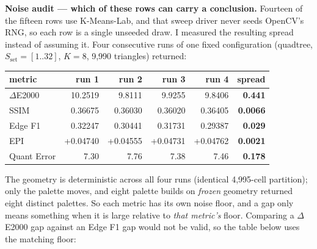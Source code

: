\documentclass[11pt,a4paper]{article}
\begin{document}
\textbf{Noise audit --- which of these rows can carry a conclusion.} Fourteen of
the fifteen rows use K-Means-Lab, and that sweep driver never seeds OpenCV's RNG,
so each row is a single unseeded draw. I measured the resulting spread instead of
assuming it. Four consecutive runs of one fixed configuration (quadtree,
$S_{\text{set}}=[1..32]$, $K=8$, 9{,}990 triangles) returned:

\begin{table}[htbp]
\centering
\begin{tabular}{@{}l r r r r r@{}}
\toprule
\textbf{metric} & \textbf{run 1} & \textbf{run 2} & \textbf{run 3} & \textbf{run 4} & \textbf{spread}\\
\midrule
$\Delta$E2000 & 10.2519 & 9.8111 & 9.9255 & 9.8406 & \textbf{0.441} \\
SSIM         & 0.36675 & 0.36030 & 0.36020 & 0.36405 & \textbf{0.0066} \\
Edge F1      & 0.32247 & 0.30441 & 0.31731 & 0.29387 & \textbf{0.029} \\
EPI          & +0.04740 & +0.04555 & +0.04731 & +0.04762 & \textbf{0.0021} \\
Quant Error  & 7.30 & 7.76 & 7.38 & 7.46 & \textbf{0.178} \\
\bottomrule
\end{tabular}
\end{table}

The geometry is deterministic across all four runs (identical 4{,}995-cell
partition); only the palette moves, and eight palette builds on \emph{frozen}
geometry returned eight distinct palettes. So each metric has its own noise
floor, and a gap only means something when it is large relative to \emph{that
metric's} floor. Comparing a $\Delta$E2000 gap against an Edge F1 gap would not
be valid, so the table below uses the matching floor:
\end{document}
